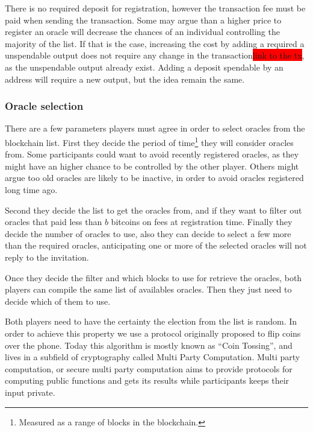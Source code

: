 There is no required deposit for registration, however the transaction fee must
  be paid when sending the transaction.
Some may argue than a higher price to register an oracle will decrease the
  chances of an individual controlling the majority of the list.
If that is the case, increasing the cost by adding a required a unspendable
  output does not require any change in the transaction\colorbox{red}{link to the tx}, as the unspendable
  output already exist. Adding a deposit spendable by an address will require
  a new output, but the idea remain the same.

\subsubsection{Oracle selection}

There are a few parameters players must agree in order to select oracles from
  the blockchain list.
First they decide the period of time\footnote{Measured as a range of blocks in
  the blockchain.} they will consider oracles from.
Some participants could want to avoid recently registered oracles, as they might
  have an higher chance to be controlled by the other player.
Others might argue too old oracles are likely to be inactive, in order to avoid
  oracles registered long time ago.

Second they decide the list to get the oracles from, and if they want to filter
  out oracles that paid less than $b$ bitcoins on fees at registration time.
Finally they decide the number of oracles to use, also they can decide to
  select a few more than the required oracles, anticipating one or more of
  the selected oracles will not reply to the invitation.

Once they decide the filter and which blocks to use for retrieve the oracles,
  both players can compile the same list of availables oracles. Then they just
  need to decide which of them to use.

Both players need to have the certainty the election from the list is random.
In order to achieve this property we use a protocol originally proposed to flip
  coins over the phone\cite{blum1983coin}.
Today this algorithm is mostly known as ``Coin Tossing'', and lives in a
  subfield of cryptography called Multi Party Computation.
Multi party computation, or secure multi party computation aims to provide
  protocols for computing public functions and gets its results while
  participants keeps their input private.


